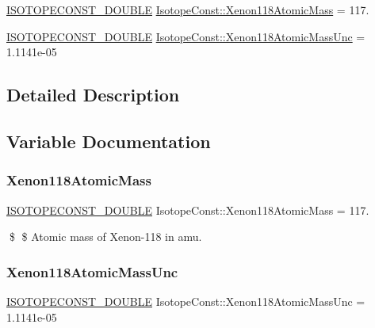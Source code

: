 \begin{DoxyCompactItemize}
\item 
\mbox{\hyperlink{group___isotope_const-_macros_ga8f45a7272ce02c0b4c65c44636ed719a}{I\+S\+O\+T\+O\+P\+E\+C\+O\+N\+S\+T\+\_\+\+D\+O\+U\+B\+LE}} \mbox{\hyperlink{group___isotope_const-_xenon-_xe118_ga973548bec4899a20e4e2a5c5a1839bfa}{Isotope\+Const\+::\+Xenon118\+Atomic\+Mass}} = 117.
\item 
\mbox{\hyperlink{group___isotope_const-_macros_ga8f45a7272ce02c0b4c65c44636ed719a}{I\+S\+O\+T\+O\+P\+E\+C\+O\+N\+S\+T\+\_\+\+D\+O\+U\+B\+LE}} \mbox{\hyperlink{group___isotope_const-_xenon-_xe118_ga2d435e0adc2f569bf5ab6c7a52d94628}{Isotope\+Const\+::\+Xenon118\+Atomic\+Mass\+Unc}} = 1.\+1141e-\/05
\end{DoxyCompactItemize}


\subsection{Detailed Description}


\subsection{Variable Documentation}
\mbox{\label{group___isotope_const-_xenon-_xe118_ga973548bec4899a20e4e2a5c5a1839bfa}} 
\subsubsection{\texorpdfstring{Xenon118\+Atomic\+Mass}{Xenon118AtomicMass}}
{\footnotesize\ttfamily \mbox{\hyperlink{group___isotope_const-_macros_ga8f45a7272ce02c0b4c65c44636ed719a}{I\+S\+O\+T\+O\+P\+E\+C\+O\+N\+S\+T\+\_\+\+D\+O\+U\+B\+LE}} Isotope\+Const\+::\+Xenon118\+Atomic\+Mass = 117.}

\$ \$ Atomic mass of Xenon-\/118 in amu. \mbox{\label{group___isotope_const-_xenon-_xe118_ga2d435e0adc2f569bf5ab6c7a52d94628}} 
\subsubsection{\texorpdfstring{Xenon118\+Atomic\+Mass\+Unc}{Xenon118AtomicMassUnc}}
{\footnotesize\ttfamily \mbox{\hyperlink{group___isotope_const-_macros_ga8f45a7272ce02c0b4c65c44636ed719a}{I\+S\+O\+T\+O\+P\+E\+C\+O\+N\+S\+T\+\_\+\+D\+O\+U\+B\+LE}} Isotope\+Const\+::\+Xenon118\+Atomic\+Mass\+Unc = 1.\+1141e-\/05}

